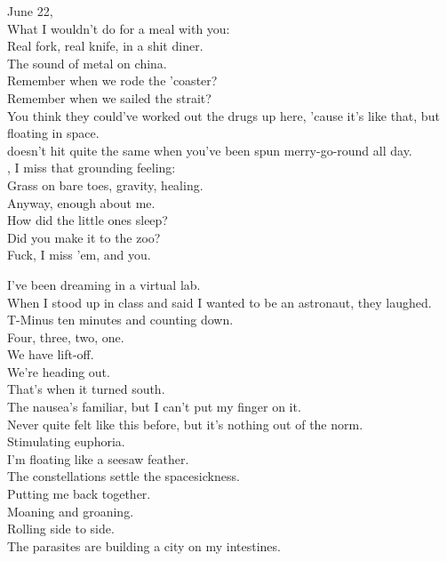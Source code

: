 June 22, \\
What I wouldn't do for a meal with you: \\
Real fork, real knife, in a shit diner. \\
The sound of metal on china. \\
Remember when we rode the 'coaster? \\
Remember when we sailed the strait? \\
You think they could've worked out the drugs up here, 'cause it's like that, but floating in space. \\

 doesn't hit quite the same when you've been spun merry-go-round all day. \\
, I miss that grounding feeling: \\
Grass on bare toes, gravity, healing. \\
Anyway, enough about me. \\
How did the little ones sleep? \\
Did you make it to the zoo? \\
Fuck, I miss 'em, and you. \\


I've been dreaming in a virtual lab. \\
When I stood up in class and said I wanted to be an astronaut, they laughed. \\
T-Minus ten minutes and counting down. \\
Four, three, two, one. \\
We have lift-off. \\
We're heading out. \\
That's when it turned south. \\

The nausea's familiar, but I can't put my finger on it. \\
Never quite felt like this before, but it's nothing out of the norm. \\
Stimulating euphoria. \\
I'm floating like a seesaw feather. \\
The constellations settle the spacesickness. \\
Putting me back together. \\

Moaning and groaning. \\
Rolling side to side. \\
The parasites are building a city on my intestines. \\


